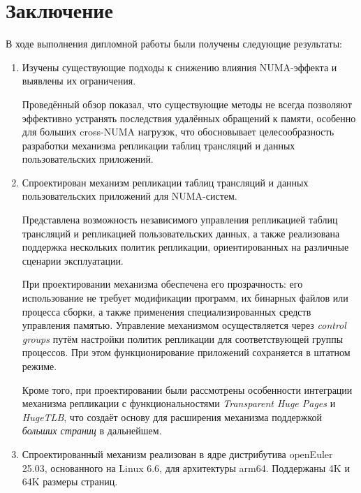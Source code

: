 \section{Заключение}
\label{sec:Chapter5} 


В ходе выполнения дипломной работы были получены следующие результаты:
\begin{enumerate}
    \item Изучены существующие подходы к снижению влияния NUMA-эффекта и выявлены их ограничения.

    Проведённый обзор показал, что существующие методы не всегда позволяют эффективно устранять последствия удалённых обращений к памяти, особенно для больших cross-NUMA нагрузок, что обосновывает целесообразность разработки механизма репликации таблиц трансляций и данных пользовательских приложений.

    \item Спроектирован механизм репликации таблиц трансляций и данных пользовательских приложений для NUMA-систем.

    Представлена возможность независимого управления репликацией таблиц трансляций и репликацией пользовательских данных, а также реализована поддержка нескольких политик репликации, ориентированных на различные сценарии эксплуатации.

    При проектировании механизма обеспечена его прозрачность: его использование не требует модификации программ, их бинарных файлов или процесса сборки, а также применения специализированных средств управления памятью. Управление механизмом осуществляется через \textit{control groups}\cite{cgroup} путём настройки политик репликации для соответствующей группы процессов. При этом функционирование приложений сохраняется в штатном режиме.

    Кроме того, при проектировании были рассмотрены особенности интеграции механизма репликации с функциональностями \textit{Transparent Huge Pages}\cite{THP} и \textit{HugeTLB}\cite{hugetlb}, что создаёт основу для расширения механизма поддержкой \textit{больших страниц} в дальнейшем.

    \item Спроектированный механизм реализован в ядре дистрибутива openEuler 25.03, основанного на Linux 6.6, для архитектуры arm64. Поддержаны 4K и 64K размеры страниц.


\end{enumerate}
